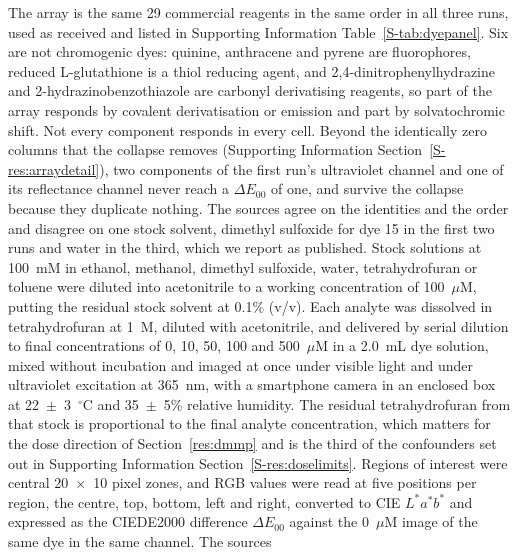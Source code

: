 \documentclass[journal=jacsat,manuscript=article,margin=1in]{achemso}
\begin{document}
The array is the same 29 commercial reagents in the same order in all three
runs, used as received and listed in Supporting Information
Table~\ref{S-tab:dyepanel}. %
Six are not chromogenic dyes: quinine, anthracene and
pyrene are fluorophores, reduced L-glutathione is a thiol reducing agent, and
2,4-dinitrophenylhydrazine and 2-hydrazinobenzothiazole are carbonyl
derivatising reagents, so part of the array responds by covalent derivatisation
or emission and part by solvatochromic shift.
Not every component responds in every cell. Beyond the identically zero columns
that the collapse removes (Supporting Information
Section~\ref{S-res:arraydetail}), two components of the first run's
ultraviolet channel and one of its reflectance channel never reach a
$\Delta E_{00}$ of one, and survive the collapse because they duplicate
nothing. The sources agree on the identities and the
order and disagree on one stock solvent, dimethyl sulfoxide for dye 15 in the
first two runs and water in the third, which we report as published. Stock
solutions at 100~mM in ethanol, methanol, dimethyl sulfoxide, water,
tetrahydrofuran or toluene were diluted into acetonitrile to a working
concentration of 100~$\mu$M, putting the residual stock solvent at 0.1\% (v/v).
Each analyte was dissolved in tetrahydrofuran at 1~M, diluted with
acetonitrile, and delivered by serial dilution to final concentrations of 0, 10,
50, 100 and 500~$\mu$M in a 2.0~mL dye solution, mixed without incubation and
imaged at once under visible light and under ultraviolet excitation at 365~nm,
with a smartphone camera in an enclosed box at 22~$\pm$~3~$^\circ$C and
35~$\pm$~5\% relative humidity. The residual tetrahydrofuran from that stock is
proportional to the final analyte concentration, which matters for the dose
direction of Section~\ref{res:dmmp} and is the third of the confounders set out
in Supporting Information Section~\ref{S-res:doselimits}. Regions of interest
were central 20~$\times$~10 pixel zones, and RGB values were read at five
positions per region, the centre, top, bottom, left and right, converted to CIE
$L^{*}a^{*}b^{*}$ and expressed as the CIEDE2000 difference $\Delta E_{00}$
against the 0~$\mu$M image of the same dye in the same channel. The sources
\end{document}
